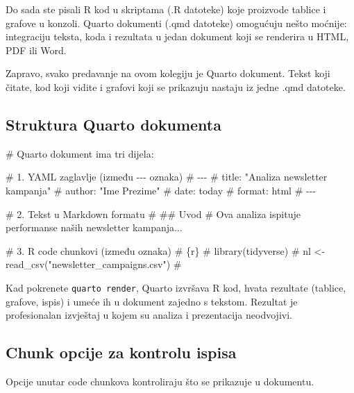 \documentclass[
  croatian,
  letterpaper,
  DIV=11,
  numbers=noendperiod]{scrartcl}
\newenvironment{Shaded}{\begin{snugshade}}{\end{snugshade}}
\newcommand{\CommentTok}[1]{\textcolor[rgb]{0.37,0.37,0.37}{#1}}
\begin{document}
Do sada ste pisali R kod u skriptama (.R datoteke) koje proizvode
tablice i grafove u konzoli. Quarto dokumenti (.qmd datoteke) omogućuju
nešto moćnije: integraciju teksta, koda i rezultata u jedan dokument
koji se renderira u HTML, PDF ili Word.

Zapravo, svako predavanje na ovom kolegiju je Quarto dokument. Tekst
koji čitate, kod koji vidite i grafovi koji se prikazuju nastaju iz
jedne .qmd datoteke.

\subsection{Struktura Quarto
dokumenta}\label{struktura-quarto-dokumenta}

\begin{Shaded}
\begin{Highlighting}[]
\CommentTok{\# Quarto dokument ima tri dijela:}

\CommentTok{\# 1. YAML zaglavlje (između {-}{-}{-} oznaka)}
\CommentTok{\# {-}{-}{-}}
\CommentTok{\# title: "Analiza newsletter kampanja"}
\CommentTok{\# author: "Ime Prezime"}
\CommentTok{\# date: today}
\CommentTok{\# format: html}
\CommentTok{\# {-}{-}{-}}

\CommentTok{\# 2. Tekst u Markdown formatu}
\CommentTok{\# \#\# Uvod}
\CommentTok{\# Ova analiza ispituje performanse naših newsletter kampanja...}

\CommentTok{\# 3. R code chunkovi (između \textasciigrave{}\textasciigrave{}\textasciigrave{} oznaka)}
\CommentTok{\# \textasciigrave{}\textasciigrave{}\textasciigrave{}\{r\}}
\CommentTok{\# library(tidyverse)}
\CommentTok{\# nl \textless{}{-} read\_csv("newsletter\_campaigns.csv")}
\CommentTok{\# \textasciigrave{}\textasciigrave{}\textasciigrave{}}
\end{Highlighting}
\end{Shaded}

Kad pokrenete \texttt{quarto\ render}, Quarto izvršava R kod, hvata
rezultate (tablice, grafove, ispis) i umeće ih u dokument zajedno s
tekstom. Rezultat je profesionalan izvještaj u kojem su analiza i
prezentacija neodvojivi.

\subsection{Chunk opcije za kontrolu
ispisa}\label{chunk-opcije-za-kontrolu-ispisa}

Opcije unutar code chunkova kontroliraju što se prikazuje u dokumentu.
\end{document}
